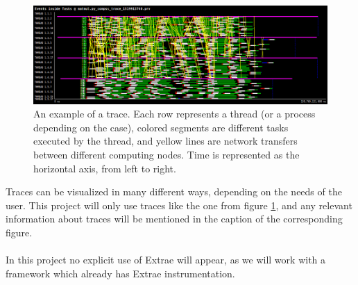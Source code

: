 \begin{figure}[ht!]
\centering
\includegraphics[scale = 0.3]{figures/matmul_trace.png}
\caption{An example of a trace. Each row represents a thread (or a process depending on the case), colored segments are different tasks executed by the thread, and yellow lines are network transfers between different computing nodes. Time is represented as the horizontal axis, from left to right.}
\label{fig:trace_example}
\end{figure}

Traces can be visualized in many different ways, depending on the needs of the user. This project will only use traces like the one from figure \ref{fig:trace_example}, and any relevant information about traces will be mentioned in the caption of the corresponding figure.\\
\\
In this project no explicit use of Extrae will appear, as we will work with a framework which already has Extrae instrumentation.

